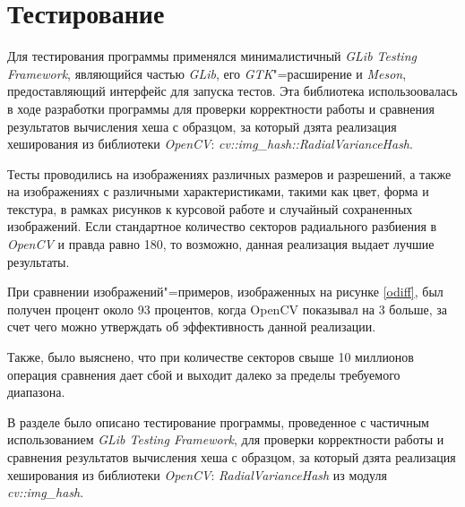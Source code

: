 \chapter{Тестирование}

Для тестирования программы применялся минималистичный \textit{GLib Testing
Framework}, являющийся частью \textit{GLib}, его \textit{GTK}"=расширение и
\textit{Meson}, предоставляющий интерфейс для запуска тестов. Эта библиотека
использоовалась в ходе разработки программы для проверки корректности работы и
сравнения результатов вычисления хеша с образцом, за который дзята реализация
хеширования из библиотеки \textit{OpenCV}:
\textit{cv::img\_hash::RadialVarianceHash}.

Тесты проводились на изображениях различных размеров и разрешений, а также на
изображениях с различными характеристиками, такими как цвет, форма и текстура, в
рамках рисунков к курсовой работе и случайный сохраненных изображений. Если
стандартное количество секторов радиального разбиения в \textit{OpenCV} и правда
равно 180, то возможно, данная реализация выдает лучшие результаты.

При сравнении изображений"=примеров, изображенных на рисунке \ref{odiff}, был
получен процент около 93 процентов, когда OpenCV показывал на 3 больше, за счет
чего можно утверждать об эффективность данной реализации.

Также, было выяснено, что при количестве секторов свыше 10 миллионов операция
сравнения дает сбой и выходит далеко за пределы требуемого диапазона.

\vspace{\baselineskip}

В разделе было описано тестирование программы, проведенное с частичным
использованием \textit{GLib Testing Framework}, для проверки корректности работы
и сравнения результатов вычисления хеша с образцом, за который дзята реализация
хеширования из библиотеки \textit{OpenCV}: \textit{RadialVarianceHash} из модуля
\textit{cv::img\_hash}.
